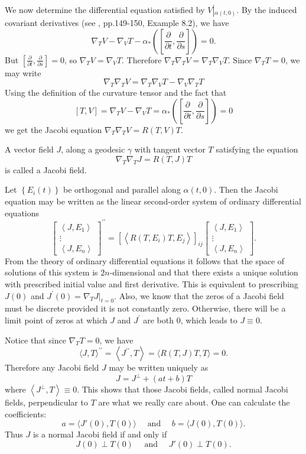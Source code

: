 \documentclass{ctexart}
\begin{document}
We now determine the differential equation satisfied by $V \left|_{\alpha(t, 0)}\right.$. By the induced covariant derivatives (see \cite{ChenWeiHuan2002}, pp.149-150, Example 8.2), we have
$$
\nabla_T V-\nabla_V T-\alpha_*\left(\left[\frac{\partial}{\partial t}, \frac{\partial}{\partial s}\right]\right)=0 .
$$
But $\left[\frac{\partial}{\partial t}, \frac{\partial}{\partial s}\right]=0$, so $\nabla_T V=\nabla_V T$. Therefore $\nabla_T \nabla_T V=\nabla_T \nabla_V T$. Since $\nabla_T T=0$, we may write
$$
\nabla_T \nabla_T V=\nabla_T \nabla_V T-\nabla_V \nabla_T T
$$
Using the definition of the curvature tensor and the fact that
$$
[T, V]=\nabla_T V-\nabla_V T=\alpha_*\left(\left[\frac{\partial}{\partial t}, \frac{\partial}{\partial s}\right]\right)=0
$$
we get the Jacobi equation $\nabla_T \nabla_T V=R(T, V) T.$
\begin{definition}
  A vector field $J$, along a geodesic $\gamma$ with tangent vector $T$ satisfying the equation 
  $$
  \nabla_T \nabla_T J=R(T, J) T
  $$
  is called a Jacobi field. 
\end{definition}
Let $\left\{E_i(t)\right\}$ be orthogonal and parallel along $\alpha(t, 0)$. Then the Jacobi equation may be written as the linear second-order system of ordinary differential equations
$$
\left[\begin{array}{c}
\left\langle J, E_1\right\rangle \\
\vdots \\
\left\langle J, E_n\right\rangle
\end{array}\right]^{\prime \prime}=\left[\left\langle R\left(T, E_i\right) T, E_j\right\rangle \right]_{i j}
\left[\begin{array}{c}
\left\langle J, E_1\right\rangle \\
\vdots \\
\left\langle J, E_n\right\rangle
\end{array}\right].
$$
From the theory of ordinary differential equations it follows that the space of solutions of this system is $2 n$-dimensional and that there exists a unique solution with prescribed initial value and first derivative. This is equivalent to prescribing $J(0)$ and $J^{\prime}(0)=\left.\nabla_T J\right|_{t=0}$. 
Also, we know that the zeros of a Jacobi field must be discrete provided it is not constantly zero. Otherwise, there will be a limit point of zeros at which $J$ and $J^\prime$ are both $0$, which leads to $J\equiv 0$.

Notice that since $\nabla_T T=0$, we have
$$
\langle J, T\rangle^{\prime \prime}=\left\langle J^{\prime \prime}, T\right\rangle=\langle R(T, J) T, T\rangle=0 .
$$
Therefore any Jacobi field $J$ may be written uniquely as
$$
J=J^\perp+(a t+b) T
$$
where $\left\langle J^\perp, T\right\rangle \equiv 0$. This shows that those Jacobi fields, called normal Jacobi fields, perpendicular to $T$ are what we really care about. 
One can calculate the coefficients: 
$$
a= \langle J'(0), T(0)\rangle \quad \text{ and } \quad b= \langle J(0), T(0)\rangle. 
$$
Thus $J$ is a normal Jacobi field if and only if 
$$
J(0)\perp T(0) \quad \text{ and } \quad J'(0)\perp T(0). 
$$
\end{document}
